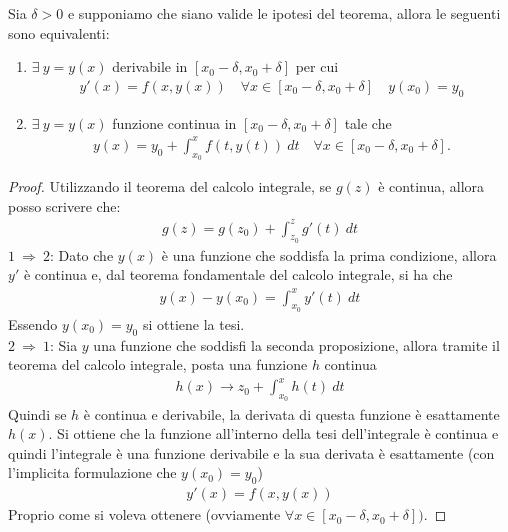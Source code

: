 \documentclass[a4paper, oneside]{book}
\begin{document}
\begin{lemma}
        Sia $\delta > 0$ e supponiamo che siano valide le
        ipotesi del teorema, allora le seguenti sono equivalenti:
        \begin{enumerate}
            \item $\exists \ y = y(x)$ derivabile in $[x_0 - \delta, x_0 + \delta]$ per cui
            \begin{gather*}
                y'(x) = f(x, y(x)) \quad \forall x \in [x_0 - \delta, x_0 + \delta] \quad y(x_0) = y_0
            \end{gather*}
            \item $\exists \ y = y(x)$ funzione continua in $[x_0 - \delta, x_0 + \delta]$ tale che
            \begin{gather*}
                y(x) = y_0 + \int_{x_0}^{x}f(t, y(t)) \ dt \quad \forall x \in [x_0 - \delta, x_0 + \delta]. 
            \end{gather*} 
        \end{enumerate}
    \end{lemma}
    \begin{proof}
        Utilizzando il teorema del calcolo integrale, se $g(z)$ è continua, allora posso scrivere che:
        \begin{gather*}
            g(z) = g(z_0) + \int_{z_0}^{z}g'(t) \ dt
        \end{gather*}
        $ 1 \ \Longrightarrow \ 2$: Dato che $y(x)$ è una funzione che soddisfa la prima condizione,
        allora $y'$ è continua e, dal teorema fondamentale del calcolo integrale, si ha che
        \begin{gather*}
            y(x) - y(x_0) = \int_{x_0}^{x}y'(t) \ dt
        \end{gather*}
        Essendo $y(x_0) = y_0$ si ottiene la tesi. \\
        $2 \ \Longrightarrow \ 1$: Sia $y$ una funzione che soddisfi la
        seconda proposizione, allora tramite il teorema del
        calcolo integrale, posta una funzione $h$ continua 
        \begin{gather*}
            h(x)  \to z_0 + \int_{x_0}^{x} h(t) \ dt
        \end{gather*}
        Quindi se $h$ è continua e derivabile, la derivata di questa funzione è esattamente $h(x)$. Si ottiene che la funzione
        all'interno della tesi dell'integrale è continua e quindi l'integrale è una funzione derivabile e la sua derivata
        è esattamente (con l'implicita formulazione che $y(x_0) = y_0$)
        \begin{gather*}
            y'(x) = f(x, y(x))
        \end{gather*}
        Proprio come si voleva ottenere (ovviamente $\forall x \in [x_0 - \delta, x_0 + \delta])$.
    \end{proof}
\end{document}
